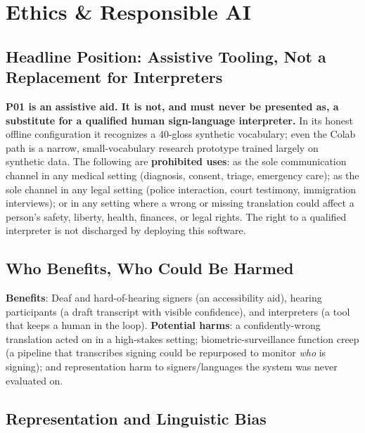 \documentclass[12pt,a4paper]{article}
\begin{document}
\section{Ethics \& Responsible AI}

\subsection{Headline Position: Assistive Tooling, Not a Replacement for Interpreters}

\textbf{P01 is an assistive aid. It is not, and must never be presented as, a substitute for a qualified human sign-language interpreter.} In its honest offline configuration it recognizes a 40-gloss synthetic vocabulary; even the Colab path is a narrow, small-vocabulary research prototype trained largely on synthetic data. The following are \textbf{prohibited uses}: as the sole communication channel in any medical setting (diagnosis, consent, triage, emergency care); as the sole channel in any legal setting (police interaction, court testimony, immigration interviews); or in any setting where a wrong or missing translation could affect a person's safety, liberty, health, finances, or legal rights. The right to a qualified interpreter is not discharged by deploying this software.

\subsection{Who Benefits, Who Could Be Harmed}

\textbf{Benefits}: Deaf and hard-of-hearing signers (an accessibility aid), hearing participants (a draft transcript with visible confidence), and interpreters (a tool that keeps a human in the loop). \textbf{Potential harms}: a confidently-wrong translation acted on in a high-stakes setting; biometric-surveillance function creep (a pipeline that transcribes signing could be repurposed to monitor \emph{who} is signing); and representation harm to signers/languages the system was never evaluated on.

\subsection{Representation and Linguistic Bias}
\end{document}
